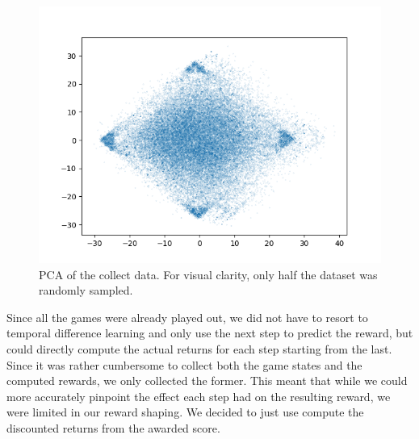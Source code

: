 \documentclass{article}
\begin{document}
\begin{figure}[h]
    \centering
    \includegraphics[scale=0.6]{plots/big_data_pca.png}
    \caption{PCA of the collect data. For visual clarity, only half the dataset was randomly sampled.}
    \label{fig:data_pca}
\end{figure}

Since all the games were already played out, we did not have to resort to temporal difference learning and only use the next step to predict the reward, but could directly compute the actual returns for each step starting from the last. Since it was rather cumbersome to collect both the game states and the computed rewards, we only collected the former. This meant that while we could more accurately pinpoint the effect each step had on the resulting reward, we were limited in our reward shaping. We decided to just use compute the discounted returns from the awarded score.  
\end{document}
